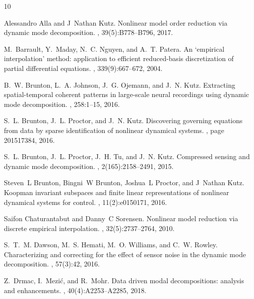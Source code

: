 \documentclass[10pt]{article}
\numberwithin{equation}{section}
\theoremstyle{plain}
\theoremstyle{remark}
\theoremstyle{remark}
\begin{document}

%
\begin{thebibliography}{10}

Alessandro Alla and J~Nathan Kutz.
\newblock Nonlinear model order reduction via dynamic mode decomposition.
, 39(5):B778--B796, 2017.

M.~Barrault, Y.~Maday, N.~C. Nguyen, and A.~T. Patera.
\newblock An `empirical interpolation' method: application to efficient
  reduced-basis discretization of partial differential equations.
, 339(9):667--672, 2004.

B.~W. Brunton, L.~A. Johnson, J.~G. Ojemann, and J.~N. Kutz.
\newblock Extracting spatial-temporal coherent patterns in large-scale neural
  recordings using dynamic mode decomposition.
, 258:1--15, 2016.

S.~L. Brunton, J.~L. Proctor, and J.~N. Kutz.
\newblock Discovering governing equations from data by sparse identification of
  nonlinear dynamical systems.
, page 201517384, 2016.

S.~L. Brunton, J.~L. Proctor, J.~H. Tu, and J.~N. Kutz.
\newblock Compressed sensing and dynamic mode decomposition.
, 2(165):2158--2491, 2015.

Steven~L Brunton, Bingni~W Brunton, Joshua~L Proctor, and J~Nathan Kutz.
\newblock Koopman invariant subspaces and finite linear representations of
  nonlinear dynamical systems for control.
, 11(2):e0150171, 2016.

Saifon Chaturantabut and Danny~C Sorensen.
\newblock Nonlinear model reduction via discrete empirical interpolation.
, 32(5):2737--2764, 2010.

S.~T.~M. Dawson, M.~S. Hemati, M.~O. Williams, and C.~W. Rowley.
\newblock Characterizing and correcting for the effect of sensor noise in the
  dynamic mode decomposition.
, 57(3):42, 2016.

Z.~Drmac, I.~Mezi{\'c}, and R.~Mohr.
\newblock Data driven modal decompositions: analysis and enhancements.
, 40(4):A2253--A2285, 2018.


\end{thebibliography}
\end{document}
